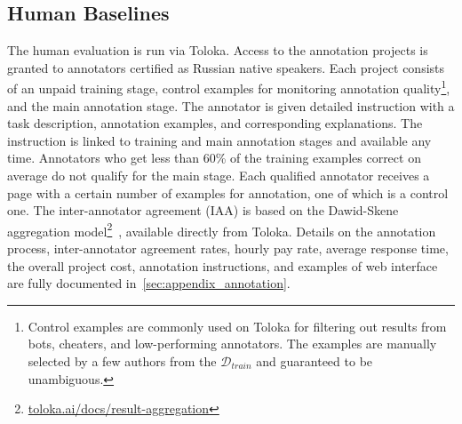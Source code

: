 \documentclass[11pt]{article}
\begin{document}
\subsection{Human Baselines}
The human evaluation is run via Toloka. Access to the annotation projects is granted to annotators certified as Russian native speakers. Each project consists of an unpaid training stage, control examples for monitoring annotation quality\footnote{Control examples are commonly used on Toloka for filtering out results from bots, cheaters, and low-performing annotators. The examples are manually selected by a few authors from the $\mathcal{D}_{train}$ and guaranteed to be unambiguous.}, and the main annotation stage. The annotator is given detailed instruction with a task description, annotation examples, and corresponding explanations. The instruction is linked to training and main annotation stages and available any time. Annotators who get less than $60$\% of the training examples correct on average do not qualify for the main stage. Each qualified annotator receives a page with a certain number of examples for annotation, one of which is a control one. The inter-annotator agreement (IAA) is based on the Dawid-Skene aggregation model\footnote{\href{https://toloka.ai/docs/guide/concepts/result-aggregation.html}{toloka.ai/docs/result-aggregation}}~\cite{dawid1979maximum}, available directly from Toloka. Details on the annotation process, inter-annotator agreement rates, hourly pay rate, average response time, the overall project cost, annotation instructions, and examples of web interface are fully documented in~\autoref{sec:appendix_annotation}.
\end{document}
